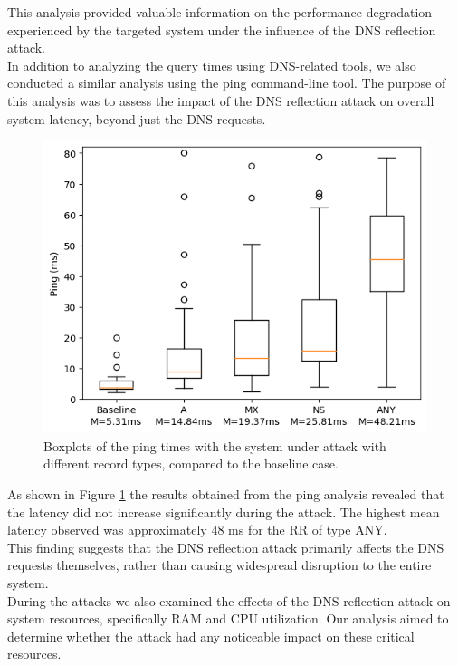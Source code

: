 This analysis provided valuable information on the performance degradation experienced by the targeted system under the influence of the DNS reflection attack.\\
In addition to analyzing the query times using DNS-related tools, we also conducted a similar analysis using the ping command-line tool. The purpose of this analysis was to assess the impact of the DNS reflection attack on overall system latency, beyond just the DNS requests.\\
\begin{figure}[H]
    \centering
    \includegraphics[width=\columnwidth]{Sections/Images/Boxplots_Ping.png}
    \caption{Boxplots of the ping times with the system under attack with different record types, compared to the baseline case.}
    \label{fig:Boxplots_Ping1}
\end{figure}
\noindent As shown in Figure \ref{fig:Boxplots_Ping1} the results obtained from the ping analysis revealed that the latency did not increase significantly during the attack. The highest mean latency observed was approximately 48 ms for the RR of type ANY. \\
This finding suggests that the DNS reflection attack primarily affects the DNS requests themselves, rather than causing widespread disruption to the entire system.\\
During the attacks we also examined the effects of the DNS reflection attack on system resources, specifically RAM and CPU utilization. Our analysis aimed to determine whether the attack had any noticeable impact on these critical resources.\\
